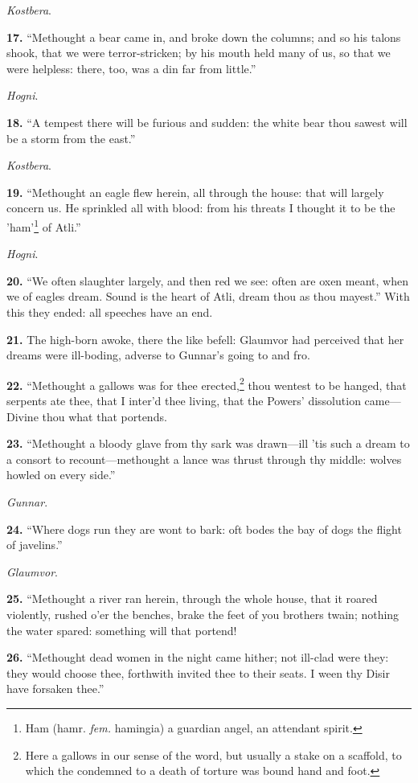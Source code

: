 \emph{Kostbera}.

\textbf{17.} ``Methought a bear came in, and broke down the columns; and so
his talons shook, that we were terror-stricken; by his mouth held many
of us, so that we were helpless: there, too, was a din far from
little.''

\emph{Hogni}.

\textbf{18.} ``A tempest there will be furious and sudden: the white bear thou
sawest will be a storm from the east.''

\emph{Kostbera}.

\textbf{19.} ``Methought an eagle flew herein, all through the house: that
will largely concern us. He sprinkled all with blood: from his threats
I thought it to be the 'ham'\footnote{Ham (hamr. \emph{fem.} hamingia) a guardian angel, an
attendant spirit.} of Atli.''

\emph{Hogni}.

\textbf{20.} ``We often slaughter largely, and then red we see: often are oxen
meant, when we of eagles dream. Sound is the heart of Atli, dream thou
as thou mayest.'' With this they ended: all speeches have an end.

\textbf{21.} The high-born awoke, there the like befell: Glaumvor had
perceived that her dreams were ill-boding, adverse to Gunnar's going
to and fro.

\textbf{22.} ``Methought a gallows was for thee erected,\footnote{Here a gallows in our sense of the word, but usually a
stake on a scaffold, to which the condemned to a death of torture was
bound hand and foot.} thou wentest to
be hanged, that serpents ate thee, that I inter'd thee living, that
the Powers' dissolution came—Divine thou what that portends.

\textbf{23.} ``Methought a bloody glave from thy sark was drawn—ill 'tis such
a dream to a consort to recount—methought a lance was thrust through
thy middle: wolves howled on every side.''

\emph{Gunnar}.

\textbf{24.} ``Where dogs run they are wont to bark: oft bodes the bay of dogs
the flight of javelins.''

\emph{Glaumvor}.

\textbf{25.} ``Methought a river ran herein, through the whole house, that it
roared violently, rushed o'er the benches, brake the feet of you
brothers twain; nothing the water spared: something will that portend!

\textbf{26.} ``Methought dead women in the night came hither; not ill-clad
were they: they would choose thee, forthwith invited thee to their
seats. I ween thy Disir have forsaken thee.''

